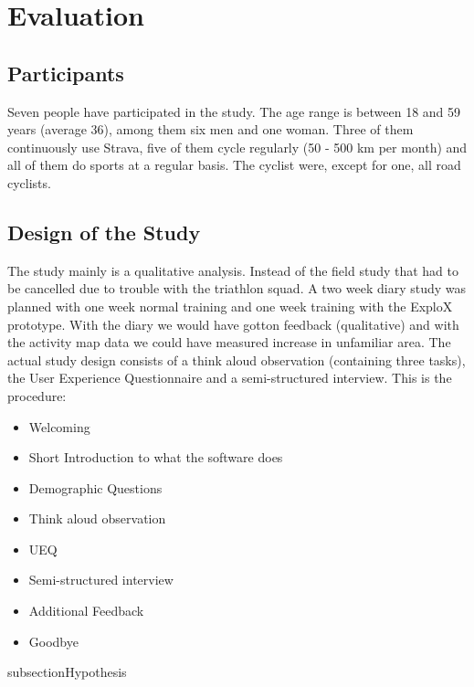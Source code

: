 \documentclass{sigchi}
\begin{document}
\section{Evaluation}

\subsection{Participants}
Seven people have participated in the study. The age range is between 18 and 59 years (average 36), among them six men and one woman. Three of them continuously use Strava, five of them cycle regularly (50 - 500 km per month) and all of them do sports at a regular basis. The cyclist were, except for one, all road cyclists.

\subsection{Design of the Study}
The study mainly is a qualitative analysis. Instead of the field study that had to be cancelled due to trouble with the triathlon squad. A two week diary study was planned with one week normal training and one week training with the ExploX prototype. With the diary we would have gotton feedback (qualitative) and with the activity map data we could have measured increase in unfamiliar area.
The actual study design consists of a think aloud observation (containing three tasks), the User Experience Questionnaire and a semi-structured interview. 
This is the procedure:
\begin{itemize}
\item Welcoming
\item Short Introduction to what the software does
\item Demographic Questions
\item Think aloud observation
\item UEQ
\item Semi-structured interview
\item Additional Feedback
\item Goodbye
\end{itemize}

subsection{Hypothesis}
\end{document}
